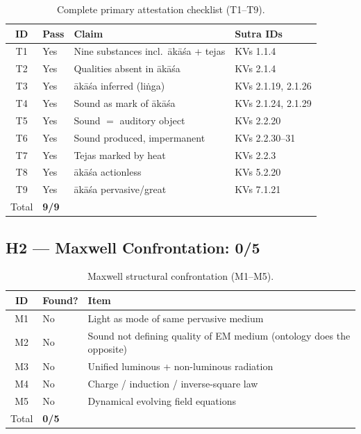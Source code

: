 \documentclass[12pt]{article}
\newcommand{\akasa}{ākāśa}
\begin{document}
\begin{table}[H]
\centering
\caption{Complete primary attestation checklist (T1--T9).}
\label{tab:Tfull}
\begin{tabular}{@{}clp{6.2cm}l@{}}
\toprule
\textbf{ID} & \textbf{Pass} & \textbf{Claim} & \textbf{Sutra IDs} \\
\midrule
T1 & Yes & Nine substances incl.\ \akasa{} + tejas & KVs 1.1.4 \\
T2 & Yes & Qualities absent in \akasa & KVs 2.1.4 \\
T3 & Yes & \akasa{} inferred (liṅga) & KVs 2.1.19, 2.1.26 \\
T4 & Yes & Sound as mark of \akasa & KVs 2.1.24, 2.1.29 \\
T5 & Yes & Sound $=$ auditory object & KVs 2.2.20 \\
T6 & Yes & Sound produced, impermanent & KVs 2.2.30--31 \\
T7 & Yes & Tejas marked by heat & KVs 2.2.3 \\
T8 & Yes & \akasa{} actionless & KVs 5.2.20 \\
T9 & Yes & \akasa{} pervasive/great & KVs 7.1.21 \\
\midrule
Total & \textbf{9/9} & & \\
\bottomrule
\end{tabular}
\end{table}

\subsection{H2 --- Maxwell Confrontation: 0/5}
\begin{table}[H]
\centering
\caption{Maxwell structural confrontation (M1--M5).}
\label{tab:M}
\begin{tabular}{@{}clp{8.8cm}@{}}
\toprule
\textbf{ID} & \textbf{Found?} & \textbf{Item} \\
\midrule
M1 & No & Light as mode of same pervasive medium \\
M2 & No & Sound not defining quality of EM medium (ontology does the opposite) \\
M3 & No & Unified luminous + non-luminous radiation \\
M4 & No & Charge / induction / inverse-square law \\
M5 & No & Dynamical evolving field equations \\
\midrule
Total & \textbf{0/5} & \\
\bottomrule
\end{tabular}
\end{table}
\end{document}
